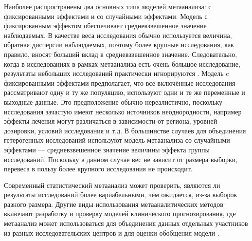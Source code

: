 Наиболее распространены два основных типа моделей метаанализа: с фиксированными эффектами и со случайными эффектами. Модель с фиксированным эффектом обеспечивает средневзвешенное значение наблюдаемых. В качестве веса исследования обычно используется величина, обратная дисперсии наблюдаемых, поэтому более крупные исследования, как правило, вносят больший вклад в средневзвешенное значение. Следовательно, когда в исследованиях в рамках метаанализа есть очень большое исследование, результаты небольших исследований практически игнорируются \autocite{Helfenstein2002}. Модель c фиксированными эффектами предполагает, что все включённые исследования рассматривают одну и ту же популяцию, используют одни и те же переменные и выходные данные. Это предположение обычно нереалистично, поскольку исследования зачастую имеют несколько источников неоднородности, например эффекты лечения могут различаться в зависимости от региона, уровней дозировки, условий исследования и т.д. В большинстве случаев для объединения гетерогенных исследований используют модель метаанализа со случайными эффектами --- средневзвешенное значение величины эффекта группы исследований. Поскольку в данном случае вес не зависит от размера выборки, перевеса в пользу более крупного исследования не происходит. 

Современный статистический метаанализ может проверить, являются ли результаты исследований более вариабельными, чем ожидается, из-за выборок разного размера. Другие виды использования метааналитических методов включают разработку и проверку моделей клинического прогнозирования, где метаанализ может использоваться для объединения данных отдельных участников из разных исследовательских центров и для оценки обобщения модели \autocite{Debray2015}. 

